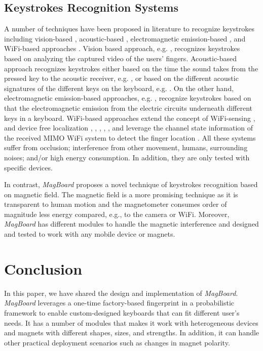 \documentclass[conference]{IEEEtran}
\def \sys {\textit{MagBoard}}
\begin{document}
\subsection{Keystrokes Recognition Systems}
A number of techniques have been proposed in literature to recognize keystrokes including vision-based \cite{balzarotti2008clearshot}, acoustic-based \cite{zhu2014context,asonov2004keyboard,wang2014ubiquitous}, electromagnetic emission-based \cite{vuagnoux2009compromising}, and WiFi-based approaches \cite{ali2015wikey}. Vision based approach, e.g. \cite{balzarotti2008clearshot}, recognizes keystrokes based on analyzing the captured video of the users' fingers. Acoustic-based approach recognizes keystrokes either based on the time the sound takes from the pressed key to the acoustic receiver, e.g. \cite{zhu2014context}, or based on the different acoustic signatures of the different keys on the keyboard, e.g. \cite{asonov2004keyboard, wang2014ubiquitous}.  On the other hand, electromagnetic emission-based approaches, e.g. \cite{vuagnoux2009compromising}, recognize keystrokes based on that the electromagnetic emission from the electric circuits underneath different keys in a keyboard. 
WiFi-based approaches extend the concept of WiFi-sensing \cite{abdelnasser2015ubibreathe}, \cite{abdelnasser2015wigest} and device free localization \cite{seifeldin2010deterministic}, \cite{el2010propagation}, \cite{eleryan2011aroma}, \cite{kassem2012rf}, \cite{saeed2014ichnaea}, \cite{abdel2013monophy} and leverage the channel state information of the received MIMO WiFi system to detect the finger location \cite{ali2015wikey}. All these systems suffer from occlusion; interference from other movement, humans, surrounding noises; and/or high energy consumption. In addition, they are only tested with specific devices.

In contrast, \sys{} proposes a novel technique of keystrokes recognition based on magnetic field. The magnetic field is a more promising technique as it is transparent to human motion and the magnetometer consumes order of magnitude less energy compared, e.g., to the camera or WiFi. Moreover, \sys{} has different modules to handle the magnetic interference and designed and tested to work with any mobile device or magnets.

\section{Conclusion}
\label{sec:conclusion}
In this paper, we have shared the design and implementation of \sys{}. \sys{} leverages a one-time factory-based fingerprint in a probabilistic framework to enable custom-designed keyboards that can fit different user's needs. It has a number of modules that makes it work with heterogeneous devices and magnets with different shapes, sizes, and strengths. In addition, it can handle other practical deployment scenarios such as changes in magnet polarity.
\end{document}
